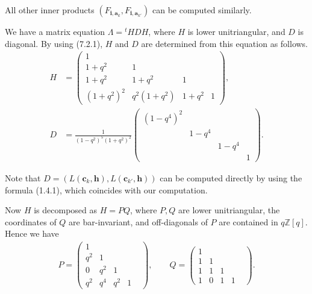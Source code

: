 \documentclass[12pt]{amsart}
\newcommand\vL{\varLambda}
\renewcommand{\1}{\mathbb 1}
\newcommand{\ZZ}{\mathbb Z}
\newcommand\Bh{\mathbf h}
\newcommand\Bi{\mathbf i}
\newcommand\Ba{\mathbf a}
\newcommand\Bc{\mathbf c}
\numberwithin{equation}{section}
\begin{document}
All other inner products $(F_{\Bi, \Ba_k}, F_{\Bi, \Ba_{k'}})$ can be computed
similarly. 

\par\medskip
We have a matrix equation $\vL = {}^tHDH$, where $H$ is lower unitriangular,
and $D$ is diagonal. 
By using (7.2.1), $H$ and $D$ are determined from this equation as follows.
{\footnotesize
\begin{align*}
\tag{7.2.3}
  H &= \begin{pmatrix}
        1          &               &         &    \\
        1+q^2      &   1           &         &    \\
        1+q^2      &   1+q^2       &   1     &    \\
        (1+q^2)^2  &   q^2(1+q^2)  &  1+q^2  &   1
      \end{pmatrix},  \\
  D &=  \frac{1}{(1-q^2)^5(1 + q^2)^2}
           \begin{pmatrix}
             (1-q^4)^2   &    &   &   \\
                         &   1-q^4  &    &  \\
                         &      &   1-q^4  &    \\
                         &      &     &   1
           \end{pmatrix}.
\end{align*}
}

Note that $D = (L(\Bc_k, \Bh), L(\Bc_{k'}, \Bh))$ can be computed directly
by using the formula (1.4.1), which coincides with our computation.
\par
Now $H$ is decomposed as $H = PQ$, where $P,Q$ are lower unitriangular,
the coordinates of $Q$ are bar-invariant, and off-diagonals of $P$ are
contained in $q\ZZ[q]$.  Hence we have
{\footnotesize
\begin{align*}
\tag{7.2.4}  
 P = \begin{pmatrix}
       1   &        &      &   &    \\
      q^2  &  1     &      &   &    \\
       0   &  q^2  &  1    &   &    \\
       q^2  &  q^4  &  q^2  &  1
     \end{pmatrix}, \qquad
 Q = \begin{pmatrix}
      1  &     &     &  &  \\
      1  &  1  &     &  &  \\
      1  &  1  &  1  &   &   \\
      1  &  0  &  1  &  1  &
     \end{pmatrix}. 
\end{align*}  
}
\end{document}
